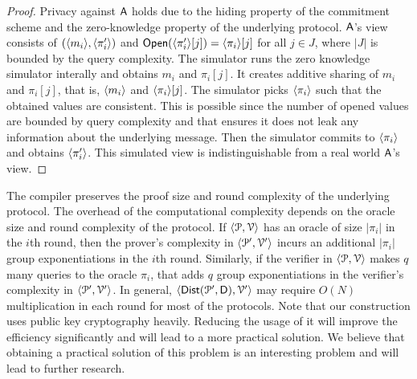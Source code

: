 \begin{proof}
	Privacy against $\mathsf{A}$ holds due to the hiding property of the commitment scheme and the zero-knowledge property of the underlying protocol. $\mathsf{A}$'s view consists of $(\langle m_i \rangle, \langle \pi'_i \rangle)$ and $\mathsf{Open}(\langle \pi'_i \rangle[j]) = \langle \pi_i \rangle[j]$ for all $j \in J$, where $|J|$ is bounded by the query complexity. 
	The simulator runs the zero knowledge simulator interally and obtains $m_i$ and $\pi_i[j]$. It creates additive sharing of $m_i$ and $\pi_i[j]$, that is, $\langle m_i \rangle$ and $\langle \pi_i \rangle[j]$. The simulator picks $\langle \pi_i \rangle$ such that the obtained values are consistent. This is possible since the number of opened values are bounded by query complexity and that ensures it does not leak any information about the underlying message. Then the simulator commits to $\langle \pi_i \rangle$ and obtains $\langle \pi'_i \rangle$. This simulated view is indistinguishable from a real world $\mathsf{A}$'s view.
\end{proof}

The compiler preserves the proof size and round complexity of the underlying protocol. The overhead of the computational complexity depends on the oracle size and round complexity of the protocol. If $\langle \mathcal{P},\mathcal{V}\rangle$ has an oracle of size $|\pi_i|$ in the $i$th round, then the prover's complexity in $\langle \mathcal{P}',\mathcal{V}'\rangle$ incurs an additional $|\pi_i|$ group exponentiations in the $i$th round. Similarly, if the verifier in $\langle \mathcal{P},\mathcal{V}\rangle$ makes $q$ many queries to the oracle $\pi_i$, that adds $q$ group exponentiations in the verifier's complexity in $\langle \mathcal{P}',\mathcal{V}'\rangle$. In general, $\langle \mathsf{Dist}(\mathcal{P}', \mathsf{D}),\mathcal{V}'\rangle$ may require $O(N)$ multiplication in each round for most of the protocols.
Note that our construction uses public key cryptography heavily. Reducing the usage of it will improve the efficiency significantly and will lead to a more practical solution. We believe that obtaining a practical solution of this problem is an interesting problem and will lead to further research.